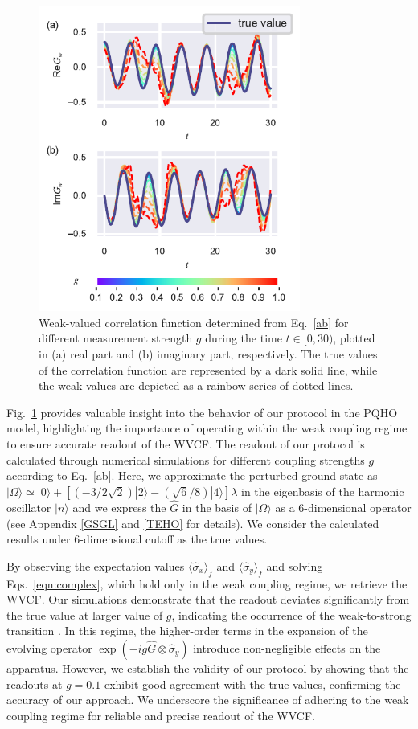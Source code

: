\documentclass[twocolumn,pra,aps,superscriptaddress]{revtex4-2}
\begin{document}
 \begin{figure}
\includegraphics[width=8.6cm]{Fig1.pdf}
\caption{\label{fig:acc_g} Weak-valued correlation function determined from Eq.~\eqref{ab} for different measurement strength $g$ during the time $t\in[0,30)$, plotted in (a) real part and (b) imaginary part, respectively. The true values of the correlation function are represented by a dark solid line, while the weak values are depicted as a rainbow series of dotted lines.}
\end{figure}



Fig.~\ref{fig:acc_g} provides valuable insight into the behavior of our protocol in the PQHO model, highlighting the importance of operating within the weak coupling regime to ensure accurate readout of the WVCF. The readout of our protocol is calculated through numerical simulations for different coupling strengths $g$ according to Eq.~\eqref{ab}. Here, we approximate the perturbed ground state as  $|\Omega\rangle\simeq|0\rangle+[(-3/2\sqrt{2})|2\rangle-(\sqrt{6}/8)|4\rangle]\lambda$ in the eigenbasis of the harmonic oscillator $|n\rangle$ and we express the $\hat{G}$ in the basis of $|\Omega\rangle$ as a 6-dimensional operator (see Appendix \ref{GSGL} and \ref{TEHO} for details). 
We consider the calculated results under 6-dimensional cutoff as the true values.

By observing the expectation values $\langle\hat{\sigma}_x\rangle_f$ and $\langle\hat{\sigma}_y\rangle_f$ and solving Eqs.~\eqref{eqn:complex}, which hold only in the weak coupling regime, we retrieve the WVCF. Our simulations demonstrate that the readout deviates significantly from the true value at larger value of $g$, indicating the occurrence of the weak-to-strong transition \cite{w2s}. In this regime, the higher-order terms in the expansion of the evolving operator $\exp(-ig\hat{G}\otimes\hat{\sigma}_y)$ introduce non-negligible effects on the apparatus. However, we establish the validity of our protocol by showing that the readouts at $g=0.1$ exhibit good agreement with the true values, confirming the accuracy of our approach. 
We underscore the significance of adhering to the weak coupling regime for reliable and precise readout of the WVCF.
\end{document}
